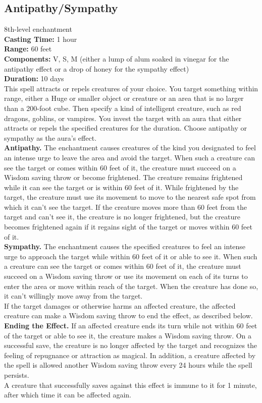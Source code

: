 \documentclass[11pt, A4paper, english]{article}
\begin{document}
		\subsection{Antipathy/Sympathy}
8th-level enchantment \\
\textbf{Casting Time:} 1 hour \\
\textbf{Range:} 60 feet \\
\textbf{Components:} V, S, M (either a lump of alum soaked in vinegar for the antipathy effect or a drop of honey for the sympathy effect) \\
\textbf{Duration:} 10 days \\
This spell attracts or repels creatures of your choice. You target something within range, either a Huge or smaller object or creature or an area that is no larger than a 200-foot cube. Then specify a kind of intelligent creature, such as red dragons, goblins, or vampires. You invest the target with an aura that either attracts or repels the specified creatures for the duration. Choose antipathy or sympathy as the aura’s effect. \\
\textbf{Antipathy.} The enchantment causes creatures of the kind you designated to feel an intense urge to leave the area and avoid the target. When such a creature can see the target or comes within 60 feet of it, the creature must succeed on a Wisdom saving throw or become frightened. The creature remains frightened while it can see the target or is within 60 feet of it. While frightened by the target, the creature must use its movement to move to the nearest safe spot from which it can’t see the target. If the creature moves more than 60 feet from the target and can’t see it, the creature is no longer frightened, but the creature becomes frightened again if it regains sight of the target or moves within 60 feet of it. \\
\textbf{Sympathy.} The enchantment causes the specified creatures to feel an intense urge to approach the target while within 60 feet of it or able to see it. When such a creature can see the target or comes within 60 feet of it, the creature must succeed on a Wisdom saving throw or use its movement on each of its turns to enter the area or move within reach of the target. When the creature has done so, it can’t willingly move away from the target. \\
If the target damages or otherwise harms an affected creature, the affected creature can make a Wisdom saving throw to end the effect, as described below. \\
\textbf{Ending the Effect.} If an affected creature ends its turn while not within 60 feet of the target or able to see it, the creature makes a Wisdom  saving throw. On a successful save, the creature is no longer affected by the target and recognizes the feeling of repugnance or attraction as magical. In addition, a creature affected by the spell is allowed another Wisdom saving throw every 24 hours while the spell persists. \\
A creature that successfully saves against this effect is immune to it for 1 minute, after which time it can be affected again.
\end{document}
